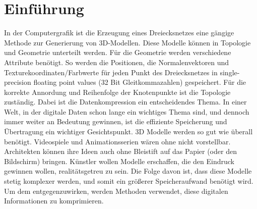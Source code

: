 \section{Einführung}

In der Computergrafik ist die Erzeugung eines Dreiecksnetzes eine gängige Methode zur Generierung von 3D-Modellen. Diese Modelle können in Topologie und Geometrie unterteilt werden. Für die Geometrie werden verschiedene Attribute benötigt. 
So werden die Positionen, die Normalenvektoren und Texturekoordinaten/Farbwerte für jeden Punkt des Dreiecksnetzes in single-precision floating point values (32 Bit Gleitkommazahlen) gespeichert. 
Für die korrekte Annordung und Reihenfolge der Knotenpunkte ist die Topologie zuständig. 
Dabei ist die Datenkompression ein entscheidendes Thema. 
In einer Welt, in der digitale Daten schon lange ein wichtiges Thema sind, und dennoch immer weiter an Bedeutung gewinnen, ist die effiziente Speicherung und Übertragung ein wichtiger Gesichtspunkt.
3D Modelle werden so gut wie überall benötigt. 
Videospiele und Animationsserien wären ohne nicht vorstellbar. 
Architekten können ihre Ideen auch ohne Bleistift auf das Papier (oder den Bildschirm) bringen.
Künstler wollen Modelle erschaffen, die den Eindruck gewinnen wollen, realitätsgetreu zu sein. 
Die Folge davon ist, dass diese Modelle stetig komplexer werden, und somit ein größerer Speicheraufwand benötigt wird. 
Um dem entgegenzuwirken, werden Methoden verwendet, diese digitalen Informationen zu komprimieren.

